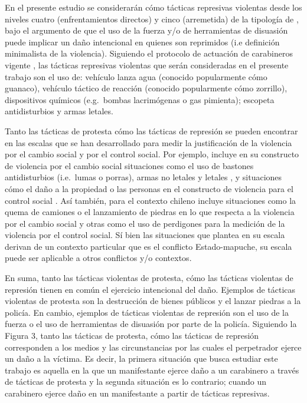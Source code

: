 \documentclass[12pt,twoside]{templates/facsothesis}
\begin{document}
En el presente estudio se considerarán cómo tácticas represivas violentas desde los niveles cuatro (enfrentamientos directos) y cinco (arremetida) de la tipología de \citet{Earl2003}, bajo el argumento de que el uso de la fuerza y/o de herramientas de disuasión puede implicar un daño intencional en quienes son reprimidos (i.e definición minimalista de la violencia). Siguiendo el protocolo de actuación de carabineros vigente \citep{Fernandez2019}, las tácticas represivas violentas que serán consideradas en el presente trabajo son el uso de: vehículo lanza agua (conocido popularmente cómo guanaco), vehículo táctico de reacción (conocido popularmente cómo zorrillo), dispositivos químicos (e.g.~bombas lacrimógenas o gas pimienta); escopeta antidisturbios y armas letales.

Tanto las tácticas de protesta cómo las tácticas de represión se pueden encontrar en las escalas que se han desarrollado para medir la justificación de la violencia por el cambio social y por el control social. Por ejemplo, \citet{Blumenthal1972} incluye en su constructo de violencia por el cambio social situaciones como el uso de bastones antidisturbios (i.e.~lumas o porras), armas no letales y letales \citep[ver Tabla 1 en][]{Blumenthal1972}, y situaciones cómo el daño a la propiedad o las personas en el constructo de violencia para el control social \citep[ver Tabla 3 en][]{Blumenthal1972}. Así también, para el contexto chileno \citet{Gerber2016} incluye situaciones como la quema de camiones o el lanzamiento de piedras en lo que respecta a la violencia por el cambio social y otras como el uso de perdigones para la medición de la violencia por el control social. Sí bien las situaciones que plantea \citet{Gerber2016} en su escala derivan de un contexto particular que es el conflicto Estado-mapuche, su escala puede ser aplicable a otros conflictos y/o contextos.

En suma, tanto las tácticas violentas de protesta, cómo las tácticas violentas de represión tienen en común el ejercicio intencional del daño. Ejemplos de tácticas violentas de protesta son la destrucción de bienes públicos y el lanzar piedras a la policía. En cambio, ejemplos de tácticas violentas de represión son el uso de la fuerza o el uso de herramientas de disuasión por parte de la policía. Siguiendo la Figura 3, tanto las tácticas de protesta, cómo las tácticas de represión corresponden a los medios y las circunstancias por las cuales el perpetrador ejerce un daño a la víctima. Es decir, la primera situación que busca estudiar este trabajo es aquella en la que un manifestante ejerce daño a un carabinero a través de tácticas de protesta y la segunda situación es lo contrario; cuando un carabinero ejerce daño en un manifestante a partir de tácticas represivas.
\end{document}
